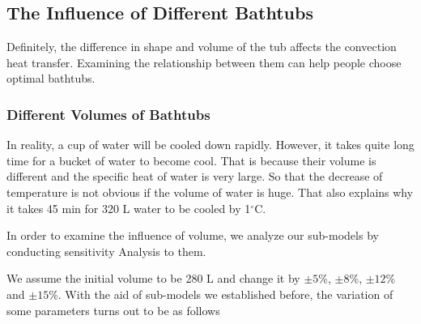 \documentclass{mcmthesis}
\begin{document}
\subsection{The Influence of Different Bathtubs}

Definitely, the difference in shape and volume of the tub affects the
convection heat transfer. Examining the relationship between them can help
people choose optimal bathtubs.

\subsubsection{Different Volumes of Bathtubs}

In reality, a cup of water will be cooled down rapidly. However, it takes quite 
long time for a bucket of water to become cool. That is because their volume is 
different and the specific heat of water is very large. So that the decrease of 
temperature is not obvious if the volume of water is huge. That also explains 
why it takes 45 min for 320 L water to be cooled by 1$^\circ$C.

In order to examine the influence of volume, we analyze our sub-models
by conducting sensitivity Analysis to them.

We assume the initial volume to be 280 L and change it by $\pm 5$\%, $\pm 8$\%, 
$\pm 12$\% and $\pm 15$\%. With the aid of sub-models we established before, the 
variation of some parameters turns out to be as follows
\end{document}
